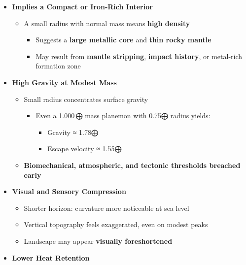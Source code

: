 \documentclass[
  letterpaper,
]{book}
\providecommand{\tightlist}{%
  \setlength{\itemsep}{0pt}\setlength{\parskip}{0pt}}
\begin{document}
\begin{itemize}
\tightlist
\item
  \textbf{Implies a Compact or Iron-Rich Interior}

  \begin{itemize}
  \tightlist
  \item
    A small radius with normal mass means \textbf{high density}

    \begin{itemize}
    \tightlist
    \item
      Suggests a \textbf{large metallic core} and \textbf{thin rocky
      mantle}
    \item
      May result from \textbf{mantle stripping}, \textbf{impact
      history}, or metal-rich formation zone
    \end{itemize}
  \end{itemize}
\item
  \textbf{High Gravity at Modest Mass}

  \begin{itemize}
  \tightlist
  \item
    Small radius concentrates surface gravity

    \begin{itemize}
    \tightlist
    \item
      Even a 1.000\,⨁ mass planemon with 0.75⨁ radius yields:

      \begin{itemize}
      \tightlist
      \item
        Gravity ≈ 1.78⨁
      \item
        Escape velocity ≈ 1.55⨁
      \end{itemize}
    \end{itemize}
  \item
    \textbf{Biomechanical, atmospheric, and tectonic thresholds breached
    early}
  \end{itemize}
\item
  \textbf{Visual and Sensory Compression}

  \begin{itemize}
  \tightlist
  \item
    Shorter horizon: curvature more noticeable at sea level
  \item
    Vertical topography feels exaggerated, even on modest peaks
  \item
    Landscape may appear \textbf{visually foreshortened}
  \end{itemize}
\item
  \textbf{Lower Heat Retention}


\end{itemize}
\end{document}
